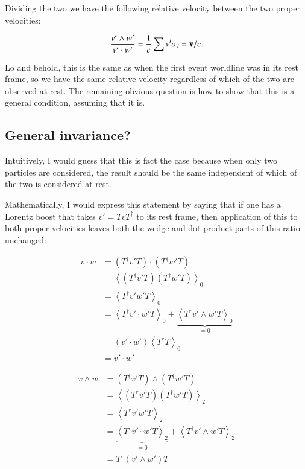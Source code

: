 \documentclass{article}      %
\newcommand{\gpgrade}[2] {{\left\langle{{#1}}\right\rangle}_{#2}}
\newcommand{\gpgradezero}[1] {\gpgrade{#1}{0}}
\newcommand{\gpgradetwo}[1] {\gpgrade{#1}{2}}
\begin{document}
Dividing the two we have the following relative velocity between the two proper velocities:

\begin{equation*}
\frac{v' \wedge w'}{v' \cdot w'} = \frac{1}{c} \sum v^i \sigma_i = \mathbf{v}/c.
\end{equation*}

Lo and behold, this is the same as when the first event worldline was in its rest frame, so we have the same
relative velocity regardless of which of the two are observed at rest.  The remaining obvious question is 
how to show that this is a general condition, assuming that it is.

\subsection{ General invariance? }

Intuitively, I would guess that this is fact the case because when only two particles are considered, the result should be the same independent of which of the
two is considered at rest.

Mathematically, I would express this statement by saying that if one has
a Lorentz boost that takes $v' = T v T^\dagger$ to its rest frame, then application of this to both proper velocities leaves both the wedge and dot product 
parts of this ratio unchanged:

\begin{align*}
v \cdot w 
&= \left(T^\dagger v' T\right) \cdot \left(T^\dagger w' T\right) \\
&= \gpgradezero{\left(T^\dagger v' T\right) \left(T^\dagger w' T\right)} \\
&= \gpgradezero{T^\dagger v' w' T} \\
&= \gpgradezero{T^\dagger v' \cdot w' T} + \underbrace{\gpgradezero{T^\dagger v' \wedge w' T}}_{=0} \\
&= \left(v' \cdot w'\right)\gpgradezero{T^\dagger T} \\
&= v' \cdot w'
\end{align*}

\begin{align*}
v \wedge w 
&= \left(T^\dagger v' T\right) \wedge \left(T^\dagger w' T\right) \\
&= \gpgradetwo{\left(T^\dagger v' T\right) \left(T^\dagger w' T\right)} \\
&= \gpgradetwo{T^\dagger v' w' T} \\
&= \underbrace{\gpgradetwo{T^\dagger v' \cdot w' T}}_{=0} + \gpgradetwo{T^\dagger v' \wedge w' T} \\
&= T^\dagger \left(v' \wedge w'\right) T
\end{align*}
\end{document}
